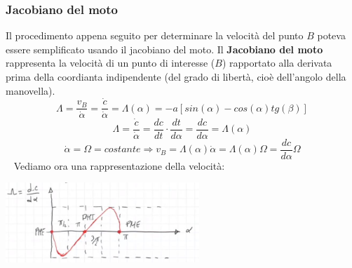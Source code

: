 \subsubsection{Jacobiano del moto}
Il procedimento appena seguito per determinare la velocità del punto $B$ poteva essere semplificato usando il jacobiano del moto.\newline
\newline
Il \textbf{Jacobiano del moto} rappresenta la velocità di un punto di interesse ($B$) rapportato alla derivata prima della coordianta indipendente (del grado di libertà, cioè dell'angolo della manovella).
\[
    \Lambda = \frac{v_B}{\dot{\alpha}} = \frac{\dot{c}}{\dot{\alpha}} = \Lambda(\alpha) = -a [sin(\alpha)- cos(\alpha) tg(\beta)]
\]
\[
    \Lambda = \frac{\dot{c}}{\dot{\alpha}} = \frac{dc}{dt} \cdot \frac{dt}{d \alpha} = \frac{dc}{d \alpha} = \Lambda (\alpha)
\]
\[
    \dot{\alpha} = \Omega = costante \Rightarrow v_B = \Lambda (\alpha) \dot{\alpha} = \Lambda (\alpha) \Omega = \frac{dc}{d \alpha} \Omega
\]
\ \newline
Vediamo ora una rappresentazione della velocità:
\begin{center}
    \includegraphics[height=3cm]{../lezione5/img4.JPG}
\end{center}

